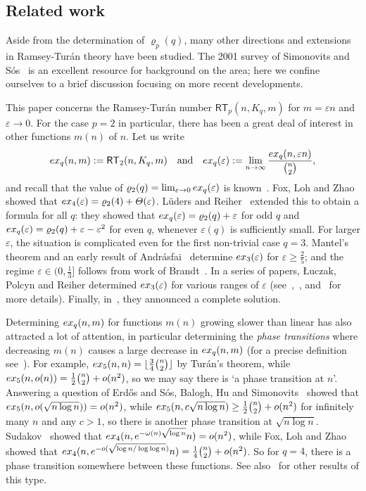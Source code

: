 \documentclass[10pt,a4paper]{article}
\theoremstyle{definition}
\def\eps{{\varepsilon}}
\newcommand{\rt}{{\mathsf{RT}}}
\begin{document}
\subsection{Related work}

Aside from the determination of $\varrho_p(q)$, many other directions and extensions in Ramsey-Tur\'an theory have been studied. The 2001 survey of Simonovits and S\'os~\cite{SimSos} is an excellent resource for background on the area; here we confine ourselves to a brief discussion focusing on more recent developments.

This paper concerns the Ramsey-Tur\'an number $\rt_p(n,K_q,m)$ for $m=\eps n$ and $\eps \to 0$. 
For the case $p=2$ in particular, there has been a great deal of interest in other functions $m(n)$ of $n$.
Let us write
$$
{\rm ex}_q(n,m) := \rt_2(n,K_q,m)\quad\text{and}\quad {\rm ex}_q(\eps) := \lim_{n\to\infty}\frac{{\rm ex}_q(n,\eps n)}{\binom{n}{2}},
$$
and recall that the value of
$\varrho_2(q) = \lim_{\eps\to 0}{\rm ex}_q(\eps)$ is known~\cite{EHSSz,ES}.
Fox, Loh and Zhao~\cite{FLZh} showed that ${\rm ex}_4(\eps) = \varrho_2(4)+\Theta(\eps)$.
L\"uders and Reiher~\cite{LuedersReiher} extended this to obtain a formula for all $q$: they showed that ${\rm ex}_q(\eps) = \varrho_2(q)+\eps$ for odd $q$ and ${\rm ex}_q(\eps) = \varrho_2(q)+\eps-\eps^2$ for even $q$, whenever $\eps(q)$ is sufficiently small. For larger $\eps$, the situation is complicated even for the first non-trivial case $q=3$.
Mantel's theorem and an early result of Andr\'asfai~\cite{Andrasfai} determine ${\rm ex}_3(\eps)$ for $\eps \geq \frac{2}{5}$; and the regime $\eps\in(0,\frac{1}{3}]$ follows from work of Brandt~\cite{Brandt}. In a series of papers, {\L}uczak, Polcyn and Reiher determined ${\rm ex}_3(\eps)$ for various ranges of $\eps$ (see~\cite{LPR1},~\cite{LPR2}, and~\cite{LPR3} for more details). Finally, in~\cite{LPR3}, they announced a complete solution.

Determining ${\rm ex}_q(n,m)$ for functions $m(n)$ growing slower than linear has also attracted a lot of attention,
in particular determining the \emph{phase transitions} where decreasing $m(n)$ causes a large decrease in ${\rm ex}_q(n,m)$ (for a precise definition see~\cite{BHS}).
For example, ${\rm ex}_5(n,n) = \lfloor\frac{3}{4}\binom{n}{2}\rfloor$ by Tur\'an's theorem, while ${\rm ex}_5(n,o(n))=\frac{1}{2}\binom{n}{2}+o(n^2)$, so we may say there is `a phase transition at $n$'. Answering a question of Erd\H{o}s and S\'os,
Balogh, Hu and Simonovits~\cite{BHS} showed that ${\rm ex}_5(n,o(\sqrt{n\log n})) = o(n^2)$, while ${\rm ex}_5(n,c\sqrt{n\log n}) \geq \frac{1}{2}\binom{n}{2}+o(n^2)$ for infinitely many $n$ and any $c > 1$, so there is another phase transition at $\sqrt{n\log n}$.
Sudakov~\cite{Sudakov} showed that ${\rm ex}_{4}(n,e^{-\omega(n)\sqrt{\log n}}n) = o(n^2)$, while Fox, Loh and Zhao~\cite{FLZh} showed that ${\rm ex}_4(n,e^{-o(\sqrt{\log n/ \log \log n})}n) = \frac{1}{4}\binom{n}{2}+o(n^2)$. So for $q=4$, there is a phase transition somewhere between these functions.
See also~\cite{BD,KKL} for other results of this type.
\end{document}
